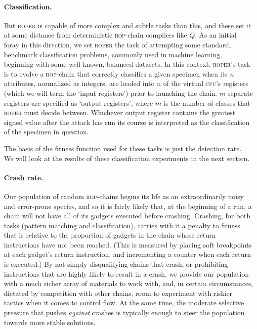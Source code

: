 \paragraph{Classification.} But \textsc{roper} is capable of
more complex and subtle tasks than this, and these set it at some
distance from deterministic \textsc{rop}-chain compilers like
$Q$. As an initial foray in this direction, we set \textsc{roper}
the task of attempting some standard, benchmark classification
problems, commonly used in machine learning, beginning with some
well-known, balanced datasets. In this context, \textsc{roper}'s
task is to evolve a \textsc{rop}-chain that correctly classifies
a given specimen when its $n$ attributes, normalized as integers,
are loaded into $n$ of the virtual \textsc{cpu}'s registers
(which we will term the `input registers') prior to launching the
chain. $m$ separate registers are specified as `output
registers', where $m$ is the number of classes that
\textsc{roper} must decide between. Whichever output register
contains the greatest signed value after the attack has run its
course is interpreted as the classification of the specimen in
question. 

The basis of the fitness function used for these tasks
is just the detection rate. %
We will look at the results of these classification experiments
in the next section. 

\paragraph{Crash rate.} Our population of random
\textsc{rop}-chains begins its life as an extraordinarily noisy
and error-prone species, and so it is fairly likely that, at the
beginning of a run, a chain will not have all of its gadgets
executed before crashing. Crashing,
for both tasks (pattern matching and classification),
carries with it a penalty to fitness that is relative to the
proportion of gadgets in the chain whose return instructions have
not been reached. (This is measured by placing soft breakpoints at
each gadget's return instruction, and incrementing a counter when
each return is executed.) By not simply disqualifying chains that
crash, or prohibiting instructions that are highly likely to
result in a crash, we provide our population with a much richer
array of materials to work with, and, in certain circumstances,
dictated by competition with other chains, room to experiment
with riskier tactics when it comes to control flow. At the same
time, the moderate selective pressure that pushes \emph{against}
crashes is typically enough to steer the population towards
more stable solutions. 

